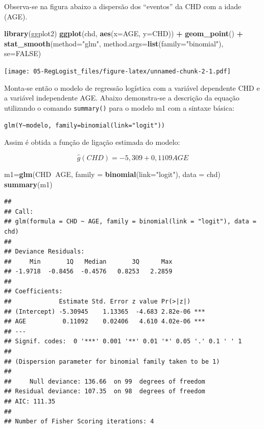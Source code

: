 \documentclass[12pt,brazil,]{book}
\newenvironment{Shaded}{\begin{snugshade}}{\end{snugshade}}
\newcommand{\DataTypeTok}[1]{\textcolor[rgb]{0.13,0.29,0.53}{#1}}
\newcommand{\KeywordTok}[1]{\textcolor[rgb]{0.13,0.29,0.53}{\textbf{#1}}}
\newcommand{\NormalTok}[1]{#1}
\newcommand{\OperatorTok}[1]{\textcolor[rgb]{0.81,0.36,0.00}{\textbf{#1}}}
\newcommand{\OtherTok}[1]{\textcolor[rgb]{0.56,0.35,0.01}{#1}}
\newcommand{\StringTok}[1]{\textcolor[rgb]{0.31,0.60,0.02}{#1}}
\begin{document}
Observa-se na figura abaixo a dispersão dos ``eventos'' da CHD com a
idade (AGE).

\begin{Shaded}
\begin{Highlighting}[]
\KeywordTok{library}\NormalTok{(ggplot2)}
\KeywordTok{ggplot}\NormalTok{(chd, }\KeywordTok{aes}\NormalTok{(}\DataTypeTok{x=}\NormalTok{AGE, }\DataTypeTok{y=}\NormalTok{CHD)) }\OperatorTok{+}\StringTok{ }\KeywordTok{geom_point}\NormalTok{() }\OperatorTok{+}\StringTok{ }
\StringTok{  }\KeywordTok{stat_smooth}\NormalTok{(}\DataTypeTok{method=}\StringTok{"glm"}\NormalTok{, }\DataTypeTok{method.args=}\KeywordTok{list}\NormalTok{(}\DataTypeTok{family=}\StringTok{"binomial"}\NormalTok{), }\DataTypeTok{se=}\OtherTok{FALSE}\NormalTok{)}
\end{Highlighting}
\end{Shaded}

\texttt{[image: 05-RegLogist\_files/figure-latex/unnamed-chunk-2-1.pdf]}

Monta-se então o modelo de regressão logística com a variável dependente
CHD e a variável independente AGE. Abaixo demonstra-se a descrição da
equação utilizando o comando \texttt{summary()} para o modelo m1 com a
sintaxe básica:

\texttt{glm(Y\textasciitilde{}modelo,\ family=binomial(link="logit"))}

Assim é obtida a função de ligação estimada do modelo:

\[
\hat g(CHD) =-5,309+0,1109AGE
\]

\begin{Shaded}
\begin{Highlighting}[]
\NormalTok{m1=}\KeywordTok{glm}\NormalTok{(CHD}\OperatorTok{~}\NormalTok{AGE, }\DataTypeTok{family =} \KeywordTok{binomial}\NormalTok{(}\DataTypeTok{link=}\StringTok{"logit"}\NormalTok{), }\DataTypeTok{data =}\NormalTok{ chd)}
\KeywordTok{summary}\NormalTok{(m1)}
\end{Highlighting}
\end{Shaded}

\begin{verbatim}
## 
## Call:
## glm(formula = CHD ~ AGE, family = binomial(link = "logit"), data = chd)
## 
## Deviance Residuals: 
##     Min       1Q   Median       3Q      Max  
## -1.9718  -0.8456  -0.4576   0.8253   2.2859  
## 
## Coefficients:
##             Estimate Std. Error z value Pr(>|z|)    
## (Intercept) -5.30945    1.13365  -4.683 2.82e-06 ***
## AGE          0.11092    0.02406   4.610 4.02e-06 ***
## ---
## Signif. codes:  0 '***' 0.001 '**' 0.01 '*' 0.05 '.' 0.1 ' ' 1
## 
## (Dispersion parameter for binomial family taken to be 1)
## 
##     Null deviance: 136.66  on 99  degrees of freedom
## Residual deviance: 107.35  on 98  degrees of freedom
## AIC: 111.35
## 
## Number of Fisher Scoring iterations: 4
\end{verbatim}
\end{document}
